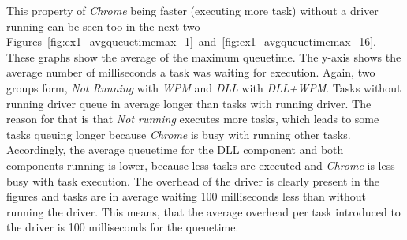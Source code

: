 This property of \emph{Chrome} being faster (executing more task) without a driver running can be seen too in the next two Figures~\ref{fig:ex1_avgqueuetimemax_1}~and~\ref{fig:ex1_avgqueuetimemax_16}. These graphs show the average of the maximum queuetime. The y-axis shows the average number of milliseconds a task was waiting for execution. Again, two groups form, \emph{Not Running} with \emph{\gls{WPM}} and \emph{\gls{DLL}} with \emph{\gls{DLL}+\gls{WPM}}. Tasks without running driver queue in average longer than tasks with running driver. The reason for that is that \emph{Not running} executes more tasks, which leads to some tasks queuing longer because \emph{Chrome} is busy with running other tasks. Accordingly, the average queuetime for the \gls{DLL} component and both components running is lower, because less tasks are executed and \emph{Chrome} is less busy with task execution. The overhead of the driver is clearly present in the figures and tasks are in average waiting 100 milliseconds less than without running the driver. This means, that the average overhead per task introduced to the driver is 100 milliseconds for the queuetime.
